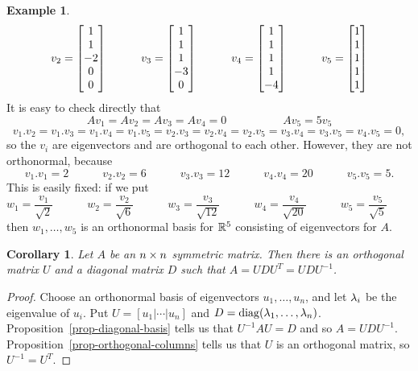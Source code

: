 \documentclass[reqno]{amsart}
\newtheorem{corollary}[theorem]{Corollary}
\theoremstyle{definition}
\newtheorem{example}[theorem]{Example}
\begin{document}
\begin{example}
\[    v_2 = \left[\begin{matrix}  1 \\  1 \\ -2 \\  0 \\  0 \end{matrix}\right] \hspace{3em}
    v_3 = \left[\begin{matrix}  1 \\  1 \\  1 \\ -3 \\  0 \end{matrix}\right] \hspace{3em}
    v_4 = \left[\begin{matrix}  1 \\  1 \\  1 \\  1 \\ -4 \end{matrix}\right] \hspace{3em}
    v_5 = \left[\begin{matrix}  1 \\  1 \\  1 \\  1 \\  1 \end{matrix}\right] 
 \]
 It is easy to check directly that 
 \[ Av_1=Av_2=Av_3=Av_4=0 \hspace{5em} Av_5=5v_5 \]
 \[ v_1.v_2=v_1.v_3=v_1.v_4=v_1.v_5=
    v_2.v_3=v_2.v_4=v_2.v_5=v_3.v_4=v_3.v_5=v_4.v_5 = 0,
 \]
 so the $v_i$ are eigenvectors and are orthogonal to each other.
 However, they are not orthonormal, because 
 \[ v_1.v_1 = 2 \hspace{3em}
    v_2.v_2 = 6 \hspace{3em}
    v_3.v_3 = 12 \hspace{3em}
    v_4.v_4 = 20 \hspace{3em}
    v_5.v_5 = 5.
 \]
 This is easily fixed: if we put 
 \[ w_1 = \frac{v_1}{\sqrt{2}} \hspace{3em}
    w_2 = \frac{v_2}{\sqrt{6}} \hspace{3em}
    w_3 = \frac{v_3}{\sqrt{12}} \hspace{3em}
    w_4 = \frac{v_4}{\sqrt{20}} \hspace{3em}
    w_5 = \frac{v_5}{\sqrt{5}} \hspace{3em}
 \]
 then $w_1,\dotsc,w_5$ is an orthonormal basis for ${\mathbb{R}}^5$ consisting
 of eigenvectors for $A$.
\end{example}

\begin{corollary}\label{cor-symmetric-diag}
 Let $A$ be an $n\times n$ symmetric matrix.  Then there is an
 orthogonal matrix $U$ and a diagonal matrix $D$ such that 
 $A=UDU^T=UDU^{-1}$.
\end{corollary}
\begin{proof}
 Choose an orthonormal basis of eigenvectors $u_1,\dotsc,u_n$, and let
 $\lambda_i$ be the eigenvalue of $u_i$.  Put $U=[u_1|\dotsb|u_n]$ and
 $D=\operatorname{diag}(\lambda_1,\dotsc,\lambda_n)$.
 Proposition~\ref{prop-diagonal-basis} tells us that $U^{-1}AU=D$ and
 so $A=UDU^{-1}$.  Proposition~\ref{prop-orthogonal-columns} tells us
 that $U$ is an orthogonal matrix, so $U^{-1}=U^T$.  
\end{proof}
\end{document}
